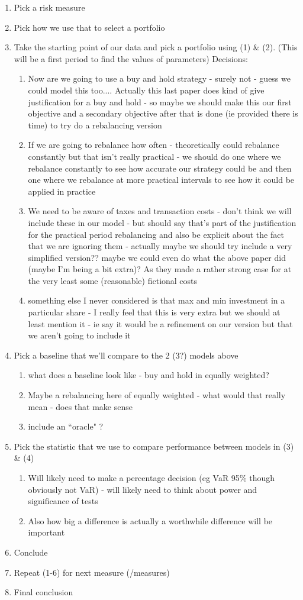 \documentclass[12pt,a4paper]{article}
\newcommand{\be}{\begin{enumerate}}
\newcommand{\ee}{\end{enumerate}}
\begin{document}
\be
\item Pick a risk measure
\item Pick how we use that to select a portfolio
\item Take the starting point of our data and pick a portfolio using (1) \& (2). (This will be a first period to find the values of parameters) Decisions:  
\be
	\item Now are we going to use a buy and hold strategy - surely not - guess we could model this too.... Actually this last paper does kind of give justification for a buy and hold - so maybe we should make this our first objective and a secondary objective after that is done (ie provided there is time) to try do a rebalancing version
	\item If we are going to rebalance how often - theoretically could rebalance constantly but that isn't really practical - we should do one where we rebalance constantly to see how accurate our strategy could be and then one where we rebalance at more practical intervals to see how it could be applied in practice 
	\item We need to be aware of taxes and transaction costs - don't think we will include these in our model - but should say that's part of the justification for the practical period rebalancing and also be explicit about the fact that we are ignoring them - actually maybe we should try include a very simplified version?? maybe we could even do what the above paper did (maybe I'm being a bit extra)? As they made a rather strong case for at the very least some (reasonable) fictional costs
	\item something else I never considered is that max and min investment in a particular share - I really feel that this is very extra but we should at least mention it - ie say it would be a refinement on our version but that we aren't going to include it
	\ee
\item Pick a baseline that we'll compare to the 2 (3?) models above
\be
	\item what does a baseline look like - buy and hold in equally weighted? 
	\item  Maybe a rebalancing here of equally weighted - what would that really mean - does that make sense
	\item include an ``oracle" ?
	\ee
\item Pick the statistic that we use to compare performance between models in (3) \& (4) 
\be
	\item Will likely need to make a percentage decision (eg VaR 95\% though obviously not VaR) - will likely need to think about power and significance of tests
	\item Also how big a difference is actually a worthwhile difference will be important
	\ee
\item Conclude
\item Repeat (1-6) for next measure (/measures)
\item Final conclusion
\ee




\newpage


\label{bib:bibliography}
 
\end{document}

